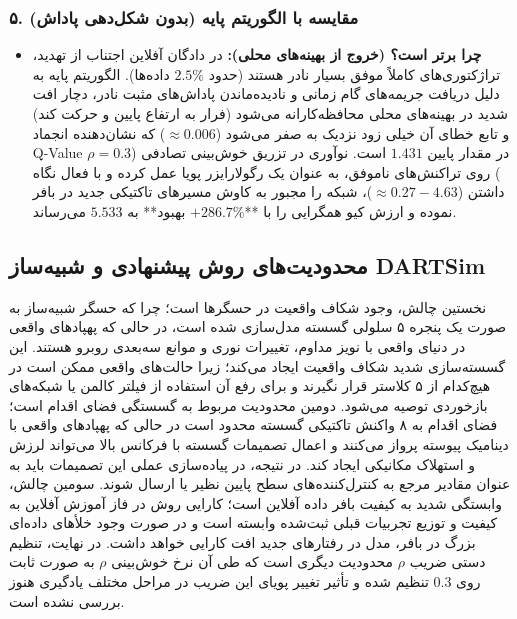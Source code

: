 \documentclass[oneside,openany,a4paper,12pt,draft]{article}
\begin{document}
\subsubsection{۵. مقایسه با الگوریتم پایه  (بدون شکل‌دهی پاداش)}
\begin{itemize}
    \item \textbf{چرا  برتر است؟ (خروج از بهینه‌های محلی):} در دادگان آفلاین اجتناب از تهدید، تراژکتوری‌های کاملاً موفق بسیار نادر هستند (حدود $2.5\%$ داده‌ها). الگوریتم  پایه به دلیل دریافت جریمه‌های گام زمانی و نادیده‌ماندن پاداش‌های مثبت نادر، دچار افت شدید در بهینه‌های محلی محافظه‌کارانه می‌شود (فرار به ارتفاع پایین و حرکت کند) و تابع خطای  آن خیلی زود نزدیک به صفر می‌شود ($\approx 0.006$) که نشان‌دهنده انجماد Q-Value در مقدار پایین $1.431$ است. نوآوری  در تزریق خوش‌بینی تصادفی ($\rho=0.3$) روی تراکنش‌های ناموفق، به عنوان یک رگولارایزر پویا عمل کرده و با فعال نگاه داشتن  ($\approx 0.27 - 4.63$)، شبکه را مجبور به کاوش مسیرهای تاکتیکی جدید در بافر نموده و ارزش کیو همگرایی را با **$+286.7\%$ بهبود** به $\mathbf{5.533}$ می‌رساند.
\end{itemize}



\subsection{محدودیت‌های روش پیشنهادی و شبیه‌ساز DARTSim}
نخستین چالش، وجود شکاف واقعیت در حسگرها است؛ چرا که حسگر شبیه‌ساز به صورت یک پنجره ۵ سلولی گسسته مدل‌سازی شده است، در حالی که پهپادهای واقعی در دنیای واقعی با نویز مداوم، تغییرات نوری و موانع سه‌بعدی روبرو هستند. این گسسته‌سازی شدید شکاف واقعیت ایجاد می‌کند؛ زیرا حالت‌های واقعی ممکن است در هیچ‌کدام از ۵ کلاستر قرار نگیرند و برای رفع آن استفاده از فیلتر کالمن یا شبکه‌های بازخوردی توصیه می‌شود. دومین محدودیت مربوط به گسستگی فضای اقدام است؛ فضای اقدام به ۸ واکنش تاکتیکی گسسته محدود است در حالی که پهپادهای واقعی با دینامیک پیوسته پرواز می‌کنند و اعمال تصمیمات گسسته با فرکانس بالا می‌تواند لرزش و استهلاک مکانیکی ایجاد کند. در نتیجه، در پیاده‌سازی عملی این تصمیمات باید به عنوان مقادیر مرجع  به کنترل‌کننده‌های سطح پایین نظیر  یا  ارسال شوند. سومین چالش، وابستگی شدید به کیفیت بافر داده آفلاین است؛ کارایی روش در فاز آموزش آفلاین به کیفیت و توزیع تجربیات قبلی ثبت‌شده وابسته است و در صورت وجود خلأهای داده‌ای بزرگ در بافر، مدل در رفتارهای جدید افت کارایی خواهد داشت. در نهایت، تنظیم دستی ضریب $\rho$ محدودیت دیگری است که طی آن نرخ خوش‌بینی $\rho$ به صورت ثابت روی $0.3$ تنظیم شده و تأثیر تغییر پویای این ضریب در مراحل مختلف یادگیری هنوز بررسی نشده است.
\end{document}
